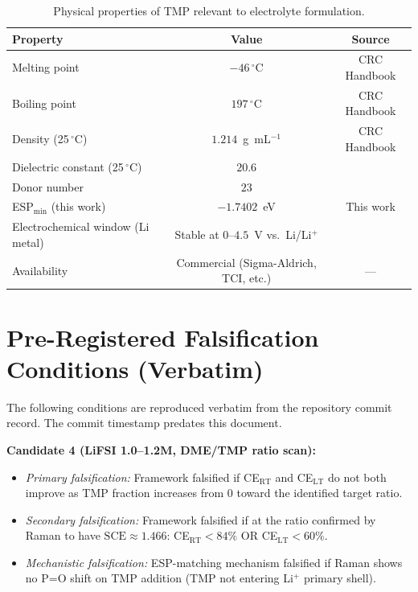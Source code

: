 \documentclass[11pt]{article}
\theoremstyle{plain}
\theoremstyle{definition}
\theoremstyle{remark}
\begin{document}
\begin{table}[h!]
\centering
\caption{Physical properties of TMP relevant to electrolyte formulation.}
\label{tab:tmp_props}
\begin{tabular}{lcc}
\toprule
Property & Value & Source \\
\midrule
Melting point & $-46\,^\circ$C & CRC Handbook \cite{CRC2024} \\
Boiling point & $197\,^\circ$C & CRC Handbook \cite{CRC2024} \\
Density (25\,$^\circ$C) & $1.214$~g~mL$^{-1}$ & CRC Handbook \cite{CRC2024} \\
Dielectric constant (25\,$^\circ$C) & $20.6$ & \cite{Reichardt2011} \\
Donor number & $23$ & \cite{Gutmann1976} \\
ESP$_{\min}$ (this work) & $-1.7402$~eV & This work \\
Electrochemical window (Li metal) & Stable at $0$--$4.5$~V vs.\ Li/Li$^+$ & \cite{Wan2021} \\
Availability & Commercial (Sigma-Aldrich, TCI, etc.) & --- \\
\bottomrule
\end{tabular}
\end{table}

\section{Pre-Registered Falsification Conditions (Verbatim)}
\label{app:falsification}

The following conditions are reproduced verbatim from the repository
commit record.  The commit timestamp predates this document.

\medskip
\noindent\textbf{Candidate 4 (LiFSI 1.0--1.2M, DME/TMP ratio scan):}
\begin{itemize}[leftmargin=2em]
  \item \textit{Primary falsification:} Framework falsified if
        CE$_{\mathrm{RT}}$ and CE$_{\mathrm{LT}}$ do not both improve
        as TMP fraction increases from 0 toward the identified target
        ratio.
  \item \textit{Secondary falsification:} Framework falsified if at
        the ratio confirmed by Raman to have $\mathrm{SCE} \approx 1.466$:
        CE$_{\mathrm{RT}} < 84\%$ OR CE$_{\mathrm{LT}} < 60\%$.
  \item \textit{Mechanistic falsification:} ESP-matching mechanism
        falsified if Raman shows no P=O shift on TMP addition (TMP
        not entering Li$^+$ primary shell).
\end{itemize}
\end{document}
